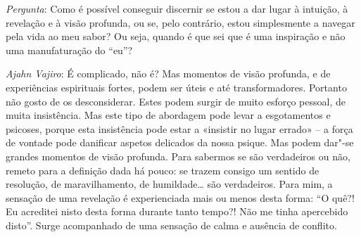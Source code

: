 \emph{Pergunta}: Como é possível conseguir discernir se estou a dar lugar à
intuição, à revelação e à visão profunda, ou se, pelo contrário, estou
simplesmente a navegar pela vida ao meu sabor? Ou seja, quando é que sei que é
uma inspiração e não uma manufaturação do ``eu''?

\emph{Ajahn Vajiro}: É complicado, não é? Mas momentos de visão profunda, e de
experiências espirituais fortes, podem ser úteis e até transformadores. Portanto
não gosto de os desconsiderar. Estes podem surgir de muito esforço pessoal, de
muita insistência. Mas este tipo de abordagem pode levar a esgotamentos e
psicoses, porque esta insistência pode estar a «insistir no lugar errado» -- a
força de vontade pode danificar aspetos delicados da nossa psique. Mas podem
dar"-se grandes momentos de visão profunda. Para sabermos se são verdadeiros ou
não, remeto para a definição dada há pouco: se trazem consigo um sentido de
resolução, de maravilhamento, de humildade\ldots{} são verdadeiros. Para mim, a
sensação de uma revelação é experienciada mais ou menos desta forma: ``O quê?!
Eu acreditei nisto desta forma durante tanto tempo?! Não me tinha apercebido
disto''. Surge acompanhado de uma sensação de calma e ausência de conflito.

